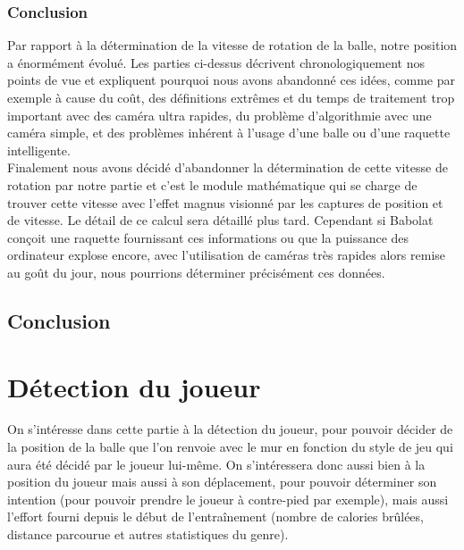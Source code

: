 \subsection{Conclusion}

Par rapport à la détermination de la vitesse de rotation de la balle, notre position a énormément évolué. Les parties ci-dessus décrivent chronologiquement nos points de vue et expliquent pourquoi nous avons abandonné ces idées, comme par exemple à cause du coût, des définitions extrêmes et du temps de traitement trop important avec des caméra ultra rapides, du problème d'algorithmie avec une caméra simple, et des problèmes inhérent à l'usage d'une balle ou d'une raquette intelligente.\\
Finalement nous avons décidé d'abandonner la détermination de cette vitesse de rotation par notre partie et c'est le module mathématique qui se charge de trouver cette vitesse avec l'effet magnus visionné par les captures de position et de vitesse. Le détail de ce calcul sera détaillé plus tard. Cependant si Babolat conçoit une raquette fournissant ces informations ou que la puissance des ordinateur explose encore, avec l'utilisation de caméras très rapides alors remise au goût du jour, nous pourrions déterminer précisément ces données.








\section{Conclusion}




















\chapter{Détection du joueur}

On s'intéresse dans cette partie à la détection du joueur, pour pouvoir décider de la position de la balle que l'on renvoie avec le mur en fonction du style de jeu qui aura été décidé par le joueur lui-même. On s'intéressera donc aussi bien à la position du joueur mais aussi à son déplacement, pour pouvoir déterminer son intention (pour pouvoir prendre le joueur à contre-pied par exemple), mais aussi l'effort fourni depuis le début de l'entraînement (nombre de calories brûlées, distance parcourue et autres statistiques du genre). \\

